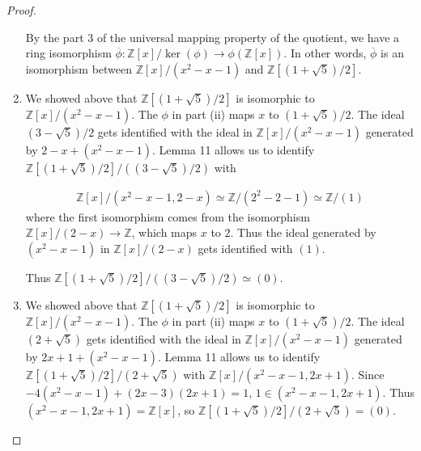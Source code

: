 \documentclass[12pt, psamsfonts]{amsart}
\theoremstyle{definition}
\theoremstyle{remark}
\numberwithin{equation}{section}
\begin{document}
\begin{proof}
\begin{enumerate}
      By the part 3 of the universal mapping property of the quotient, we have a ring isomorphism $\overline{\phi}: \mathbb{Z}[x]/\ker(\phi) \rightarrow \phi(\mathbb{Z}[x])$.
      In other words, $\overline{\phi}$ is an isomorphism between $\mathbb{Z}[x]/(x^2 - x- 1)$ and $\mathbb{Z}[(1 + \sqrt{5})/2]$.
    \item
      We showed above that $\mathbb{Z}[(1 + \sqrt{5})/2]$ is isomorphic to $\mathbb{Z}[x]/(x^2 - x - 1)$.
      The $\phi$ in part (ii)  maps $x$ to $(1 + \sqrt{5}) / 2$.
      The ideal $(3 - \sqrt{5}) / 2$ gets identified with the ideal in $\mathbb{Z}[x]/(x^2 - x - 1)$ generated by $2 - x + (x^2 - x - 1)$.
      Lemma 11 allows us to identify $\mathbb{Z}[(1 + \sqrt{5})/2]/((3 - \sqrt{5})/2)$ with

      \begin{align*}
        \mathbb{Z}[x]/(x^2 - x - 1, 2 - x) \simeq \mathbb{Z}/(2^2 - 2 - 1) \simeq \mathbb{Z}/(1)
      \end{align*}
      where the first isomorphism comes from the isomorphism $\mathbb{Z}[x] / (2 - x) \rightarrow \mathbb{Z}$, which maps $x$ to $2$.
      Thus the ideal generated by $(x^2 - x - 1)$ in $\mathbb{Z}[x]/(2 - x)$ gets identified with $(1)$.

      Thus $\mathbb{Z}[(1 + \sqrt{5})/2]/((3 - \sqrt{5})/2) \simeq (0)$.
    \item
      We showed above that $\mathbb{Z}[(1 + \sqrt{5})/2]$ is isomorphic to $\mathbb{Z}[x]/(x^2 - x - 1)$.
      The $\phi$ in part (ii)  maps $x$ to $(1 + \sqrt{5}) / 2$.
      The ideal $(2 + \sqrt{5})$ gets identified with the ideal in $\mathbb{Z}[x]/(x^2 - x - 1)$ generated by $2x + 1 + (x^2 - x - 1)$.
      Lemma 11 allows us to identify $\mathbb{Z}[(1 + \sqrt{5})/2]/(2 + \sqrt{5})$ with $\mathbb{Z}[x]/(x^2 - x - 1, 2x + 1)$.
      Since $-4(x^2 - x - 1) + (2x - 3)(2x + 1) = 1$, $1 \in (x^2 - x - 1, 2x + 1)$.
      Thus $(x^2 - x - 1, 2x + 1) = \mathbb{Z}[x]$, so $\mathbb{Z}[(1 + \sqrt{5})/2]/(2 + \sqrt{5}) = (0)$.
  \end{enumerate}
\end{proof}
\end{document}
